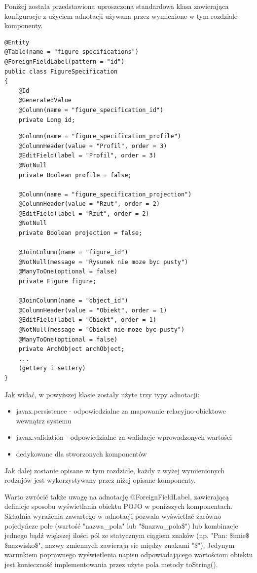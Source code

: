 Poniżej została przedstawiona uproszczona standardowa klasa zawierająca konfiguracje z użyciem adnotacji używana przez wymienione w tym rozdziale komponenty. 
\begin{lstlisting}
@Entity
@Table(name = "figure_specifications")
@ForeignFieldLabel(pattern = "id")
public class FigureSpecification
{
	@Id
	@GeneratedValue
	@Column(name = "figure_specification_id")
	private Long id;
\end{lstlisting}
\newpage
\begin{lstlisting}
	@Column(name = "figure_specification_profile")
	@ColumnHeader(value = "Profil", order = 3)
	@EditField(label = "Profil", order = 3)
	@NotNull
	private Boolean profile = false;

	@Column(name = "figure_specification_projection")
	@ColumnHeader(value = "Rzut", order = 2)
	@EditField(label = "Rzut", order = 2)
	@NotNull
	private Boolean projection = false;

	@JoinColumn(name = "figure_id")
	@NotNull(message = "Rysunek nie moze byc pusty")
	@ManyToOne(optional = false)
	private Figure figure;

	@JoinColumn(name = "object_id")
	@ColumnHeader(value = "Obiekt", order = 1)
	@EditField(label = "Obiekt", order = 1)
	@NotNull(message = "Obiekt nie moze byc pusty")
	@ManyToOne(optional = false)
	private ArchObject archObject;
	...
	(gettery i settery)
}
\end{lstlisting}
Jak widać, w powyższej klasie zostały użyte trzy typy adnotacji:
\begin{itemize}
\item javax.persistence - odpowiedzialne za mapowanie relacyjno-obiektowe wewnątrz systemu
\item javax.validation - odpowiedzialne za walidacje wprowadzonych wartości
\item dedykowane dla stworzonych komponentów
\end{itemize}
Jak dalej zostanie opisane w tym rozdziale, każdy z wyżej wymienionych rodzajów jest wykorzystywany przez niżej opisane komponenty.

\newpage
Warto zwrócić także uwagę na adnotację @ForeignFieldLabel, zawierającą definicje sposobu wyświetlania obiektu POJO w poniższych komponentach. Składnia wyrażenia zawartego w adnotacji pozwala wyświetlać zarówno pojedyńcze pole (wartość "nazwa\_pola" lub "\$nazwa\_pola\$") lub kombinacje jednego bądź większej ilości pól ze statycznym ciągiem znaków (np. "Pan: \$imie\$ \$nazwisko\$", nazwy zmiennych zawierają sie między znakami "\$"). Jedynym warunkiem poprawnego wyświetlenia napisu odpowiadającego wartościom obiektu jest konieczność implementowania przez użyte pola metody toString().

